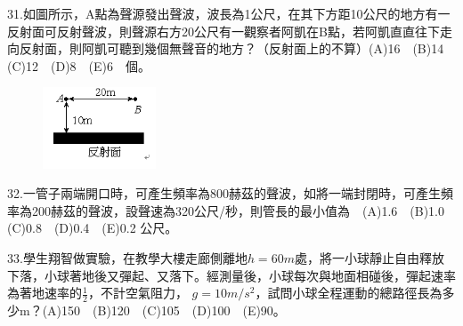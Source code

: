 \documentclass[cn,10pt,math=newtx,chinesefont=founder,device=ig]{elegantbook}
\begin{document}
\newpage


\begin{example}
   31.如圖所示，A點為聲源發出聲波，波長為1公尺，在其下方距10公尺的地方有一反射面可反射聲波，則聲源右方20公尺有一觀察者阿凱在B點，若阿凱直直往下走向反射面，則阿凱可聽到幾個無聲音的地方？（反射面上的不算）(A)16　(B)14　(C)12　(D)8　(E)6　個。\\
    \rightline{[成德高中教甄109]}
\end{example}
\begin{solution}
    
\end{solution}
\begin{figure}[htbp]
    \flushright
    \includegraphics[width=0.3\textwidth]{image/109成德31.png}
  \end{figure}
\newpage



\begin{example}
   32.一管子兩端開口時，可產生頻率為800赫茲的聲波，如將一端封閉時，可產生頻率為200赫茲的聲波，設聲速為320公尺/秒，則管長的最小值為　(A)1.6　(B)1.0　(C)0.8　(D)0.4　(E)0.2  公尺。\\
    \rightline{[成德高中教甄109]}
\end{example}
\begin{solution}
    
\end{solution}

\newpage


\begin{example}
   33.學生翔智做實驗，在教學大樓走廊側離地$h=60m$處，將一小球靜止自由釋放下落，小球著地後又彈起、又落下。經測量後，小球每次與地面相碰後，彈起速率為著地速率的$\frac{1}{2}$，不計空氣阻力， $g=10 m/s^2$，試問小球全程運動的總路徑長為多少m？(A)150　(B)120　(C)105　(D)100　(E)90。\\
    \rightline{[成德高中教甄109]}
\end{example}
\begin{solution}
    
\end{solution}

\newpage
\end{document}
